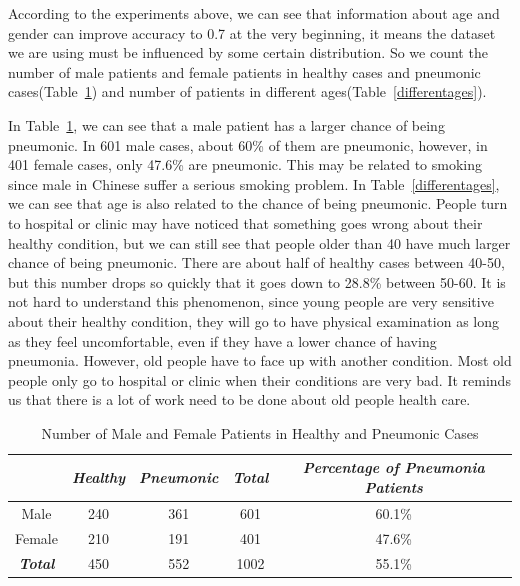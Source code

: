 \documentclass[runningheads]{llncs}
\begin{document}
According to the experiments above, we can see that information about age and gender can improve accuracy to 0.7 at the very beginning, it means the dataset we are using must be influenced by some certain distribution. So we count the number of male patients and female patients in healthy cases and pneumonic cases(Table~\ref{malefemale}) and number of patients in different ages(Table~\ref{differentages}). 

In Table~\ref{malefemale}, we can see that a male patient has a larger chance of being pneumonic. In 601 male cases, about 60\% of them are pneumonic, however, in 401 female cases, only 47.6\% are pneumonic. This may be related to smoking since male in Chinese suffer a serious smoking problem. 
In Table~\ref{differentages}, we can see that age is also related to the chance of being pneumonic. People turn to hospital or clinic may have noticed that something goes wrong about their healthy condition, but we can still see that people older than 40 have much larger chance of being pneumonic. There are about half of healthy cases between 40-50, but this number drops so quickly that it goes down to 28.8\% between 50-60. It is not hard to understand this phenomenon, since young people are very sensitive about their healthy condition, they will go to have physical examination as long as they feel uncomfortable, even if they have a lower chance of having pneumonia. However, old people have to face up with another condition. Most old people only go to hospital or clinic when their conditions are very bad. It reminds us that there is a lot of work need to be done about old people health care.



\begin{table}[htb]
    \vspace{-0cm}
    \caption{Number of Male and Female Patients in Healthy and Pneumonic Cases}
    \vspace{-0cm}
    \begin{center}
    \begin{tabular}{|c|c|c|c|c|}
    \hline
    \textbf{\textit{}} & \textbf{\textit{Healthy}} & \textbf{\textit{Pneumonic}}& \textbf{\textit{Total}}& \textbf{\textit{Percentage of Pneumonia Patients}} \\
    \hline
    Male & 240 & 361 & 601 & 60.1\%\\
    Female & 210 & 191 & 401 &47.6\% \\
    \hline
    \textbf{\textit{Total}} & 450 & 552 & 1002 & 55.1\% \\
    
    \hline
    \end{tabular}
    \vspace{-0.0cm}
    \label{malefemale}
    \end{center}
    \vspace{-0.0cm}
    \end{table}
\end{document}
